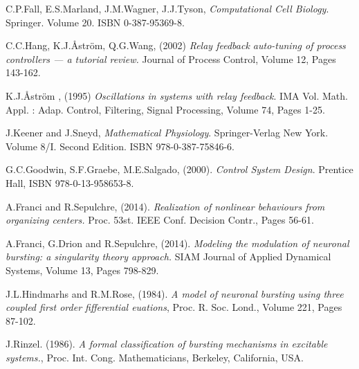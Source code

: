 \documentclass[a4paper, 12pt]{article}
\begin{document}
\begin{thebibliography}{9}


C.P.Fall, E.S.Marland, J.M.Wagner, J.J.Tyson, \emph{Computational Cell Biology}. Springer. Volume 20. ISBN 0-387-95369-8. 

 C.C.Hang, K.J.\r{A}str\"{o}m, Q.G.Wang, (2002) \emph{Relay feedback auto-tuning of process controllers --- a tutorial review.} Journal of Process Control, Volume 12, Pages 143-162. 

K.J.\r{A}str\"{o}m , (1995) \emph{Oscillations in systems with relay feedback}. IMA Vol. Math. Appl. : Adap. Control, Filtering, Signal Processing, Volume 74, Pages 1-25. 

J.Keener and J.Sneyd, \emph{Mathematical Physiology}. Springer-Verlag New York. Volume 8/I. Second Edition. ISBN 978-0-387-75846-6. 

G.C.Goodwin, S.F.Graebe, M.E.Salgado, (2000). \emph{Control System Design}. Prentice Hall, ISBN 978-0-13-958653-8.

A.Franci and R.Sepulchre, (2014). \emph{Realization of nonlinear behaviours from organizing centers.} Proc. 53st. IEEE Conf. Decision Contr., Pages 56-61.

A.Franci, G.Drion and R.Sepulchre, (2014). \emph{Modeling the modulation of neuronal bursting: a singularity theory approach.} SIAM Journal of Applied Dynamical Systems, Volume 13, Pages 798-829. 

J.L.Hindmarhs and R.M.Rose, (1984). \emph{A model of neuronal bursting using three coupled first order fifferential euations}, Proc. R. Soc. Lond., Volume 221, Pages 87-102. 

 J.Rinzel. (1986). \emph{A formal classification of bursting mechanisms in excitable systems.}, Proc. Int. Cong. Mathematicians, Berkeley, California, USA. 


\end{thebibliography}
\end{document}
